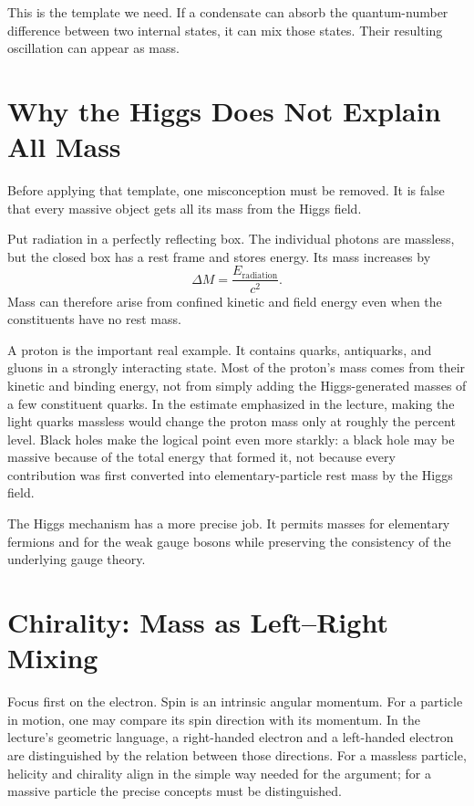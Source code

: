 This is the template we need. If a condensate can absorb the quantum-number difference between two internal states, it can mix those states. Their resulting oscillation can appear as mass.

\section{Why the Higgs Does Not Explain All Mass}

Before applying that template, one misconception must be removed. It is false that every massive object gets all its mass from the Higgs field.

Put radiation in a perfectly reflecting box. The individual photons are massless, but the closed box has a rest frame and stores energy. Its mass increases by
\begin{equation}
\Delta M=\frac{E_{\mathrm{radiation}}}{c^{2}}.
\end{equation}
Mass can therefore arise from confined kinetic and field energy even when the constituents have no rest mass.

A proton is the important real example. It contains quarks, antiquarks, and gluons in a strongly interacting state. Most of the proton's mass comes from their kinetic and binding energy, not from simply adding the Higgs-generated masses of a few constituent quarks. In the estimate emphasized in the lecture, making the light quarks massless would change the proton mass only at roughly the percent level. Black holes make the logical point even more starkly: a black hole may be massive because of the total energy that formed it, not because every contribution was first converted into elementary-particle rest mass by the Higgs field.

The Higgs mechanism has a more precise job. It permits masses for elementary fermions and for the weak gauge bosons while preserving the consistency of the underlying gauge theory.

\section{Chirality: Mass as Left--Right Mixing}

Focus first on the electron. Spin is an intrinsic angular momentum. For a particle in motion, one may compare its spin direction with its momentum. In the lecture's geometric language, a right-handed electron and a left-handed electron are distinguished by the relation between those directions. For a massless particle, helicity and chirality align in the simple way needed for the argument; for a massive particle the precise concepts must be distinguished.

